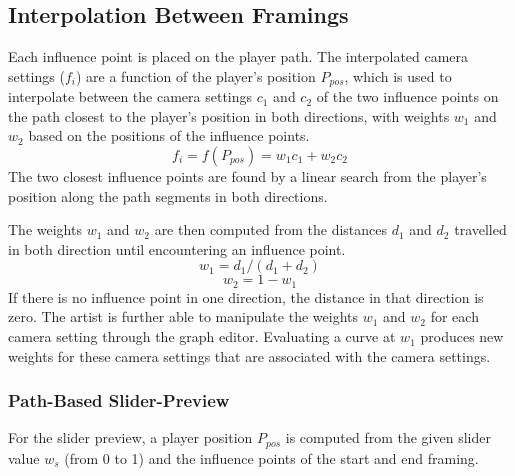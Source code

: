 \begin{verbatim}

\end{verbatim}

\subsection{Interpolation Between Framings} \label{interpolationChapter}
Each influence point is placed on the player path. The interpolated camera settings ($f_{i}$) are a function of the player's position $P_{pos}$, which is used to interpolate between the camera settings $c_1$ and $c_2$ of the two influence points on the path closest to the player's position in both directions, with weights $w_1$ and $w_2$ based on the positions of the influence points.
\begin{equation}
f_{i} = f(P_{pos}) = w_1c_1+w_2c_2
\end{equation}
The two closest influence points are found by a linear search from the player's position along the path segments in both directions.

The weights $w_1$ and $w_2$ are then computed from the distances $d_1$ and $d_2$ travelled in both direction until encountering an influence point.
\begin{equation}
w_1 = {d_1}/(d_1 + d_2)
\end{equation}
\begin{equation}
{w_2 = 1-w_1}
\end{equation}
If there is no influence point in one direction, the distance in that direction is zero. The artist is further able to manipulate the weights $w_1$ and $w_2$ for each camera setting through the graph editor. Evaluating a curve at $w_1$ produces new weights for these camera settings that are associated with the camera settings.


\subsubsection{Path-Based Slider-Preview}
For the slider preview, a player position $P_{pos}$ is computed from the given slider value $w_s$ (from 0 to 1) and the influence points of the start and end framing.

